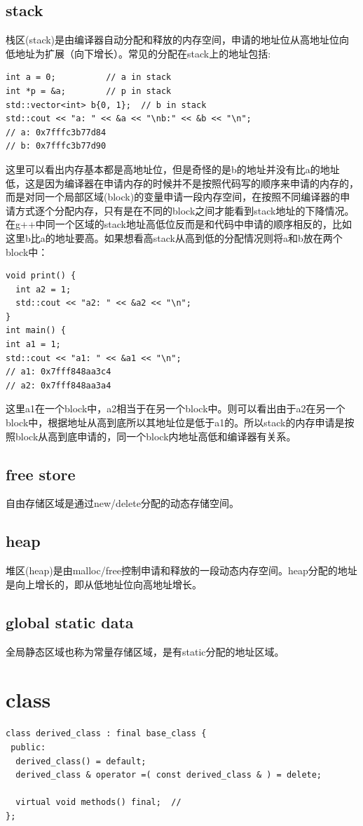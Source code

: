 \documentclass[12pt]{book}
\begin{document}
\subsection{stack}
栈区(stack)是由编译器自动分配和释放的内存空间，申请的地址位从高地址位向低地址为扩展（向下增长）。常见的分配在stack上的地址包括:
\begin{lstlisting}
int a = 0;          // a in stack
int *p = &a;        // p in stack
std::vector<int> b{0, 1};  // b in stack
std::cout << "a: " << &a << "\nb:" << &b << "\n";
// a: 0x7fffc3b77d84
// b: 0x7fffc3b77d90
\end{lstlisting}
这里可以看出内存基本都是高地址位，但是奇怪的是b的地址并没有比a的地址低，这是因为编译器在申请内存的时候并不是按照代码写的顺序来申请的内存的，而是对同一个局部区域(block)的变量申请一段内存空间，在按照不同编译器的申请方式逐个分配内存，只有是在不同的block之间才能看到stack地址的下降情况。在g++中同一个区域的stack地址高低位反而是和代码中申请的顺序相反的，比如这里b比a的地址要高。如果想看高stack从高到低的分配情况则将a和b放在两个block中：
\begin{lstlisting}
void print() {
  int a2 = 1;
  std::cout << "a2: " << &a2 << "\n";
}
int main() {
int a1 = 1;
std::cout << "a1: " << &a1 << "\n";
// a1: 0x7fff848aa3c4
// a2: 0x7fff848aa3a4
\end{lstlisting}
这里a1在一个block中，a2相当于在另一个block中。则可以看出由于a2在另一个block中，根据地址从高到底所以其地址位是低于a1的。所以stack的内存申请是按照block从高到底申请的，同一个block内地址高低和编译器有关系。
\subsection{free store}
自由存储区域是通过new/delete分配的动态存储空间。

\subsection{heap}
堆区(heap)是由malloc/free控制申请和释放的一段动态内存空间。heap分配的地址是向上增长的，即从低地址位向高地址增长。

\subsection{global static data}
全局静态区域也称为常量存储区域，是有static分配的地址区域。

\section{class}
\begin{lstlisting}
class derived_class : final base_class {
 public:
  derived_class() = default;
  derived_class & operator =( const derived_class & ) = delete;
  
  virtual void methods() final;	 //
};
\end{lstlisting}
\end{document}
